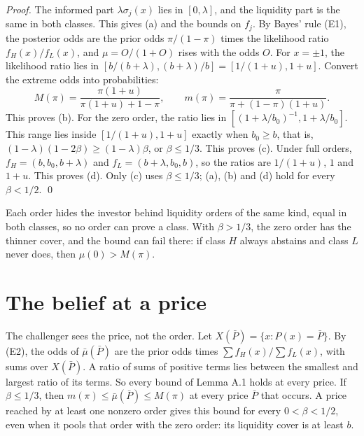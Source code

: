 \emph{Proof.} The informed part \(\lambda\sigma_j(x)\) lies in \([0,\lambda]\), and the liquidity part is the same in both classes. This gives (a) and the bounds on \(f_j\). By Bayes' rule (E1), the posterior odds are the prior odds \(\pi/(1-\pi)\) times the likelihood ratio \(f_H(x)/f_L(x)\), and \(\mu=O/(1+O)\) rises with the odds \(O\). For \(x=\pm1\), the likelihood ratio lies in \([b/(b+\lambda),(b+\lambda)/b]=[1/(1+u),1+u]\). Convert the extreme odds into probabilities:
\begin{equation}\label{eq:beliefs-bounds}
M(\pi)=\frac{\pi(1+u)}{\pi(1+u)+1-\pi},\qquad
m(\pi)=\frac{\pi}{\pi+(1-\pi)(1+u)} .
\end{equation}
This proves (b). For the zero order, the ratio lies in \([(1+\lambda/b_0)^{-1},1+\lambda/b_0]\). This range lies inside \([1/(1+u),1+u]\) exactly when \(b_0\ge b\), that is, \((1-\lambda)(1-2\beta)\ge(1-\lambda)\beta\), or \(\beta\le1/3\). This proves (c). Under full orders, \(f_H=(b,b_0,b+\lambda)\) and \(f_L=(b+\lambda,b_0,b)\), so the ratios are \(1/(1+u)\), \(1\) and \(1+u\). This proves (d). Only (c) uses \(\beta\le1/3\); (a), (b) and (d) hold for every \(\beta<1/2\). \qed

\begin{intuition}
Each order hides the investor behind liquidity orders of the same kind, equal in both classes, so no order can prove a class. With \(\beta>1/3\), the zero order has the thinner cover, and the bound can fail there: if class \(H\) always abstains and class \(L\) never does, then \(\mu(0)>M(\pi)\).
\end{intuition}

\section{The belief at a price}\label{sec:beliefs-price-belief}

The challenger sees the price, not the order. Let \(X(\bar P)=\{x:P(x)=\bar P\}\). By (E2), the odds of \(\bar\mu(\bar P)\) are the prior odds times \(\sum f_H(x)/\sum f_L(x)\), with sums over \(X(\bar P)\). A ratio of sums of positive terms lies between the smallest and largest ratio of its terms. So every bound of Lemma A.1 holds at every price. If \(\beta\le1/3\), then \(m(\pi)\le\bar\mu(\bar P)\le M(\pi)\) at every price \(\bar P\) that occurs.
A price reached by at least one nonzero order gives this bound for every \(0<\beta<1/2\), even when it pools that order with the zero order: its liquidity cover is at least \(b\).

